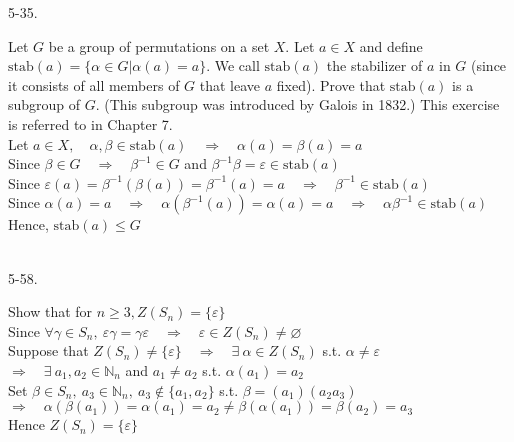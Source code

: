 \documentclass[12pt]{book}
\begin{document}
\begin{CJK}{UTF8}{bsmi}
5-35. \begin{minipage}[t]{\dimexpr\linewidth-2em}
Let $G$ be a group of permutations on a set $X$. Let $a \in X$ and define
$\mathrm{stab}(a) = \{\alpha \in G | \alpha(a) = a\}$. We call $\mathrm{stab}(a)$ the stabilizer of $a$ in $G$ (since it consists of all members of $G$ that leave $a$ fixed). Prove that $\mathrm{stab}(a)$ is a subgroup of $G$. (This subgroup was introduced by Galois in 1832.) This exercise is referred to in Chapter 7. \\
Let $a\in X,\quad\alpha, \beta\in\mathrm{stab}(a)\quad\Rightarrow\quad \alpha(a)=\beta(a)=a$ \\
Since $\beta\in G\quad\Rightarrow\quad \beta^{-1}\in G$ and $\beta^{-1}\beta=\varepsilon\in\mathrm{stab}(a)$ \\
Since $\varepsilon(a)=\beta^{-1}(\beta(a))=\beta^{-1}(a)=a\quad\Rightarrow\quad\beta^{-1}\in\mathrm{stab}(a)$ \\
Since $\alpha(a)=a\quad\Rightarrow\quad\alpha(\beta^{-1}(a))=\alpha(a)=a\quad\Rightarrow\quad\alpha\beta^{-1}\in\mathrm{stab}(a)$ \\
Hence, $\mathrm{stab}(a)\le G$
\end{minipage} \\

5-58. \begin{minipage}[t]{\dimexpr\linewidth-2em}
Show that for $n\ge3, Z(S_n)=\{\varepsilon\}$ \\
Since $\forall\gamma\in S_n,\ \varepsilon\gamma=\gamma\varepsilon\quad\Rightarrow\quad\varepsilon\in Z(S_n)\ne\varnothing$ \\
Suppose that $Z(S_n)\ne\{\varepsilon\}\quad\Rightarrow\quad\exists\ \alpha\in Z(S_n)$ s.t. $\alpha\ne\varepsilon$ \\
$\Rightarrow\quad\exists\ a_1, a_2\in\mathbb{N}_n$ and $a_1\ne a_2$ s.t. $\alpha(a_1)=a_2$ \\
Set $\beta\in S_n,\ a_3\in\mathbb{N}_n,\ a_3\notin\{a_1, a_2\}$ s.t. $\beta=(a_1)(a_2a_3)$ \\
$\Rightarrow\quad\alpha(\beta(a_1))=\alpha(a_1)=a_2\ne\beta(\alpha(a_1))=\beta(a_2)=a_3$ \\
Hence $Z(S_n)=\{\varepsilon\}$
\end{minipage} \\

\end{CJK}
\end{document}
